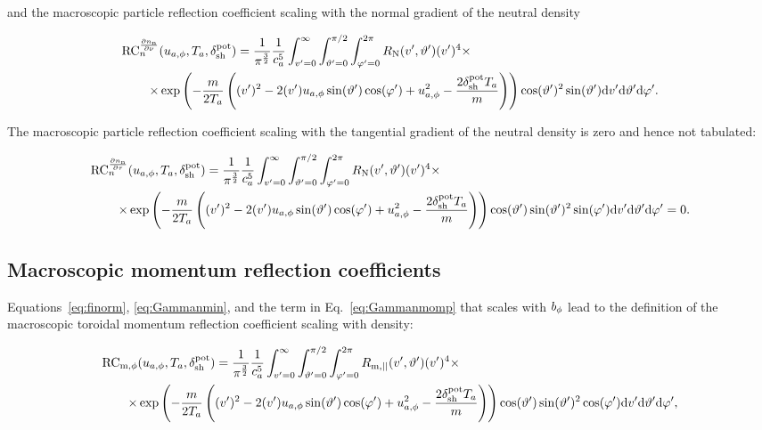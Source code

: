 \noindent and the macroscopic particle reflection coefficient scaling with the normal gradient of the neutral density

\begin{align}
    \mathrm{RC}_n^{\frac{\partial n_\mathrm{n}}{\partial \nu}} & (u_{a,\phi},T_a,\delta_{\mathrm{sh}}^{\mathrm{pot}}) =
     \frac{1}{\pi^{\frac{3}{2}}} \frac{1}{c_a^{5}} \int_{v'=0}^{\infty} \int_{\vartheta'=0}^{\pi/2} \int_{\varphi'=0}^{2\pi}
    R_{\mathrm{N}}(v',\vartheta') (v')^4 \times \nonumber \\
    \times & \exp \left( - \frac{m}{2 T_a} \left( (v')^2-2 (v') u_{a,\phi} \sin (\vartheta') \cos (\varphi') + u_{a,\phi}^2 - \frac{2 \delta_{\mathrm{sh}}^{\mathrm{pot}} T_a}{m} \right) \right) \cos (\vartheta')^2 \sin (\vartheta')
    \mathrm{d} v' \mathrm{d} \vartheta' \mathrm{d} \varphi'. \label{eq:rctwoi_def}
\end{align}

\noindent The macroscopic particle reflection coefficient scaling with the tangential gradient of the neutral density is zero and hence not tabulated:

\begin{align}
    \mathrm{RC}_n^{\frac{\partial n_\mathrm{n}}{\partial \tau}} & (u_{a,\phi},T_a,\delta_{\mathrm{sh}}^{\mathrm{pot}}) =
     \frac{1}{\pi^{\frac{3}{2}}} \frac{1}{c_a^{5} }\int_{v'=0}^{\infty} \int_{\vartheta'=0}^{\pi/2} \int_{\varphi'=0}^{2\pi}
    R_{\mathrm{N}}(v',\vartheta') (v')^4 \times \nonumber \\
    \times & \exp \left( - \frac{m}{2 T_a} \left( (v')^2-2 (v') u_{a,\phi} \sin (\vartheta') \cos (\varphi') + u_{a,\phi}^2 - \frac{2 \delta_{\mathrm{sh}}^{\mathrm{pot}} T_a}{m} \right) \right) \cos (\vartheta') \sin (\vartheta')^2 \sin (\varphi')
    \mathrm{d} v' \mathrm{d} \vartheta' \mathrm{d} \varphi' = 0.
\end{align}

\subsection{Macroscopic momentum reflection coefficients}

Equations~\eqref{eq:finorm}, \eqref{eq:Gammanmin}, and the term in Eq.~\eqref{eq:Gammanmomp} that scales with $b_{\phi}$ lead to the definition of the macroscopic toroidal momentum reflection coefficient scaling with density:

\begin{align}
    \mathrm{RC}_{\mathrm{m},\phi} & (u_{a,\phi},T_a,\delta_{\mathrm{sh}}^{\mathrm{pot}}) =
         \frac{1}{\pi^\frac{3}{2}} \frac{1}{c_a^5} \int_{v'=0}^{\infty} \int_{\vartheta'=0}^{\pi/2} \int_{\varphi'=0}^{2\pi}
    R_{\mathrm{m,||}}(v',\vartheta') (v')^4 \times \nonumber \\
    \times & \exp \left( - \frac{m}{2 T_a} \left( (v')^2-2 (v') u_{a,\phi} \sin (\vartheta') \cos (\varphi') + u_{a,\phi}^2 - \frac{2 \delta_{\mathrm{sh}}^{\mathrm{pot}} T_a}{m} \right) \right) \cos (\vartheta') \sin (\vartheta')^2 \cos (\varphi')
    \mathrm{d} v' \mathrm{d} \vartheta' \mathrm{d} \varphi', \label{eq:rmxonei_def}
\end{align}

